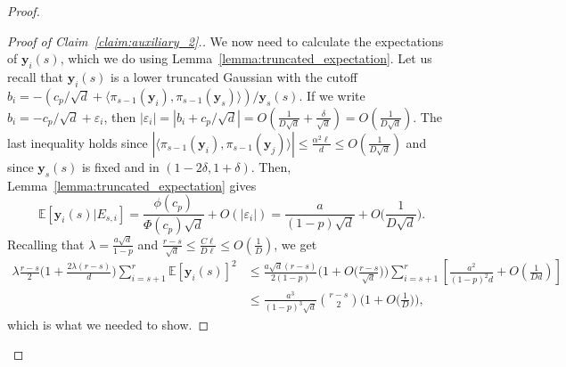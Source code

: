 \documentclass[10pt,a4paper]{amsart}
\def\bE{\mathbb{E}}
\def\by{\boldsymbol{y}}
\def\eps{\varepsilon}
\begin{document}
\begin{proof}
\begin{proof}[Proof of Claim~\ref{claim:auxiliary_2}.]
We now need to calculate the expectations of $\by_i(s)$, which we do using Lemma~\ref{lemma:truncated_expectation}. Let us recall that $\by_i(s)$ is a lower truncated Gaussian with the cutoff $b_i=-(c_p/\sqrt{d}+\langle \pi_{s-1}(\by_i), \pi_{s-1}(\by_s)\rangle)/\by_s(s)$. If we write $b_i=-c_p/\sqrt{d}+\eps_i$, then $|\eps_i|=|b_i+c_p/\sqrt{d}|=O(\frac{1}{D\sqrt{d}}+\frac{\delta}{\sqrt{d}})=O(\frac{1}{D\sqrt{d}})$. The last inequality holds since $|\langle \pi_{s-1}(\by_i), \pi_{s-1}(\by_j)\rangle|\leq \frac{\alpha^2\ell}{d}\leq O(\frac{1}{D\sqrt{d}})$ and since $\by_s(s)$ is fixed and in $(1-2\delta, 1+\delta)$. Then, Lemma~\ref{lemma:truncated_expectation} gives
{\smaller[0.3]
\[\bE[\by_i(s)|E_{s, i}]=\frac{\phi(c_p)}{\Phi(c_p)\sqrt{d}}\!+\!O(|\eps_i|)=\frac{a}{(1\!-\!p)\sqrt{d}}\!+\!O\Big(\frac{1}{D\sqrt{d}}\Big).\]
}
Recalling that $\lambda=\frac{a\sqrt{d}}{1-p}$ and $\frac{r-s}{\sqrt{d}}\leq \frac{C\ell}{D\ell}\leq O(\frac{1}{D})$, we get
{\smaller[0.3]
\begin{align*}
\lambda \frac{r\!-\!s}{2} \Big(1\!+\!\frac{2\lambda (r\!-\!s)}{d}\Big)\sum_{i=s+1}^r \bE[\by_i(s)]^2&\leq \frac{a\sqrt{d}(r\!-\!s)}{2(1\!-\!p)}\Big(1\!+\!O\Big(\frac{r\!-\!s}{\sqrt{d}}\Big)\Big)\sum_{i=s+1}^r \left[\frac{a^2}{(1\!-\!p)^2d}\!+\!O\left(\frac{1}{Dd}\right)\right]\\
&\leq \frac{a^3}{(1\!-\!p)^3\sqrt{d}}\binom{r\!-\!s}{2}\Big(1\!+\!O\big(\frac{1}{D}\big)\Big),
\end{align*}
}
which is what we needed to show.
\end{proof}
\end{proof}
\end{document}
